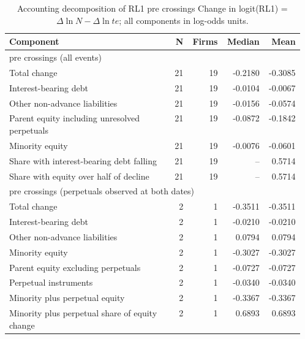 \begin{table}[!htbp]\centering\scriptsize
\caption{Accounting decomposition of RL1 pre crossings Change in logit(RL1) = $\Delta\ln N - \Delta\ln te$; all components in log-odds units.}
\begin{threeparttable}
\begin{tabular}{p{0.56\linewidth}rrrr}
\toprule
Component & N & Firms & Median & Mean \\
\midrule
\multicolumn{5}{l}{pre crossings (all events)} \\
Total change & 21 & 19 & -0.2180 & -0.3085 \\
Interest-bearing debt & 21 & 19 & -0.0104 & -0.0067 \\
Other non-advance liabilities & 21 & 19 & -0.0156 & -0.0574 \\
Parent equity including unresolved perpetuals & 21 & 19 & -0.0872 & -0.1842 \\
Minority equity & 21 & 19 & -0.0076 & -0.0601 \\
Share with interest-bearing debt falling & 21 & 19 & -- & 0.5714 \\
Share with equity over half of decline & 21 & 19 & -- & 0.5714 \\
\multicolumn{5}{l}{pre crossings (perpetuals observed at both dates)} \\
Total change & 2 & 1 & -0.3511 & -0.3511 \\
Interest-bearing debt & 2 & 1 & -0.0210 & -0.0210 \\
Other non-advance liabilities & 2 & 1 & 0.0794 & 0.0794 \\
Minority equity & 2 & 1 & -0.3027 & -0.3027 \\
Parent equity excluding perpetuals & 2 & 1 & -0.0727 & -0.0727 \\
Perpetual instruments & 2 & 1 & -0.0340 & -0.0340 \\
Minority plus perpetual equity & 2 & 1 & -0.3367 & -0.3367 \\
Minority plus perpetual share of equity change & 2 & 1 & 0.6893 & 0.6893 \\
\bottomrule
\end{tabular}
\begin{tablenotes}[flushleft]\footnotesize

\end{tablenotes}
\end{threeparttable}
\end{table}
